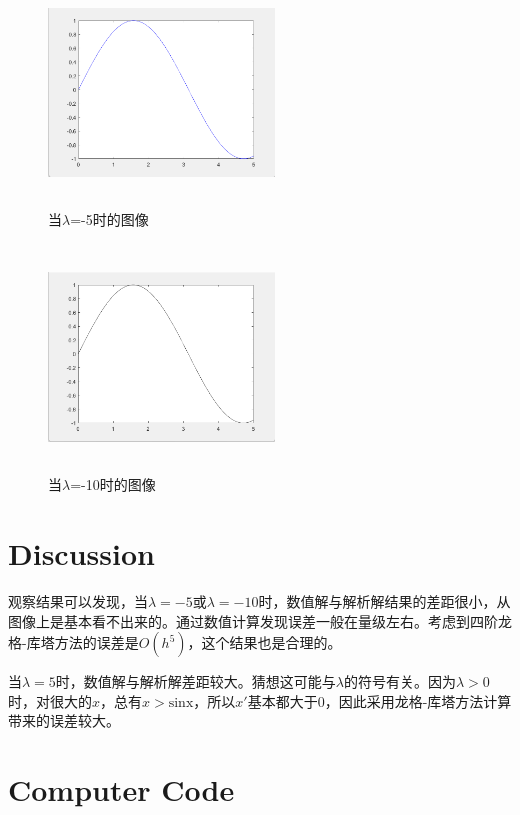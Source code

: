 \documentclass{article}
\begin{document}
	\begin{figure}[H]
		\begin{center}
			
			\includegraphics[width=6cm,height=6cm]{-5}
			
			\caption{当$\lambda$=-5时的图像} \label{-5.label}
		\end{center}
	\end{figure}
	
		\begin{figure}[H]
		\begin{center}
			
			\includegraphics[width=6cm,height=6cm]{-10}
			
			\caption{当$\lambda$=-10时的图像} \label{-10.label}
		\end{center}
	\end{figure}
	
	
	\section{Discussion}
	
	观察结果可以发现，当$\lambda=-5$或$\lambda=-10$时，数值解与解析解结果的差距很小，从图像上是基本看不出来的。通过数值计算发现误差一般在量级左右。考虑到四阶龙格-库塔方法的误差是$O(h^5)$，这个结果也是合理的。
	
	当$\lambda=5$时，数值解与解析解差距较大。猜想这可能与$\lambda$的符号有关。因为$\lambda > 0$时，对很大的$x$，总有$x > \text{sinx}$，所以$x'$基本都大于0，因此采用龙格-库塔方法计算带来的误差较大。

	
	
	
	\section{Computer Code}
	
	
	
\end{document}

